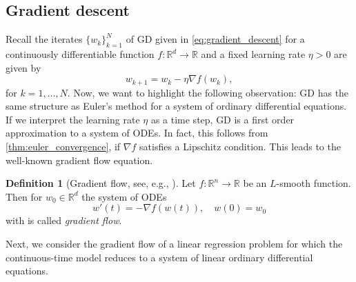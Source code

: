 \documentclass[12pt]{article}
\theoremstyle{definition}
\newtheorem{definition}[definition]{Definition}
\numberwithin{equation}{section}
\newcommand{\R}{\mathbb{R}}
\begin{document}
\subsection{Gradient descent}
\label{sec:gradient_flow}
Recall the iterates $\{ w_k\}_{k=1}^N$ of GD given in \eqref{eq:gradient_descent} for a continuously differentiable function $f : \R^d \rightarrow \R$ and a fixed learning rate $\eta > 0$ are given by
\begin{equation*}
  w_{k+1} = w_{k} - \eta \nabla f(w_{k}),
\end{equation*}
for $k=1,\dots,N$. Now, we want to highlight the following observation: GD has the same structure as Euler's method for a system of ordinary differential equations. If we interpret the learning rate $\eta$ as a time step, GD is a first order approximation to a system of ODEs. In fact, this follows from \autoref{thm:euler_convergence}, if $\nabla f$ satisfies a Lipschitz condition. This leads to the well-known gradient flow equation.
\begin{definition}[Gradient flow, see, e.g., ]
  Let $f : \R^n \rightarrow \R$ be an $L$-smooth function. Then for $w_0 \in \R^d$ the system of ODEs 
  \begin{equation}
  \label{eq:gradient_flow}
  w'(t) = - \nabla f(w(t)), \quad w(0) = w_0
  \end{equation}
  with is called \emph{gradient flow}.
\end{definition}
Next, we consider the gradient flow of a linear regression problem for which the continuous-time model reduces to a system of linear ordinary differential equations.
\end{document}
